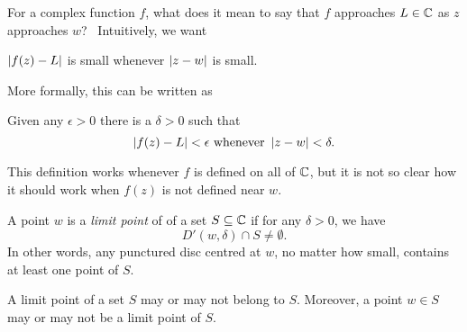  For a complex function $f$, what does it mean to say that $f$ approaches $L \in \mathbb{C}$ as $z$ approaches $w$?  \ Intuitively, we want
 \begin{center}
 $\left| f(z)-L \right|$ is small whenever  $\left| z-w \right|$ is small.
 \end{center}
  More formally, this can be written as
 \begin{center}
 Given any $\epsilon>0$ there is a $\delta>0$ such that
 \[
 \left| f(z)-L \right| < \epsilon\text{ whenever } \left| z-w \right|<\delta.
 \]
 \end{center}
 
 This definition works whenever $f$ is defined on all of $\mathbb{C}$, but it is not so clear how it should work when $f(z)$ is not defined near $w$.  
 
 
 \begin{definition}
 A point $w$ is a \emph{limit point} of of a set $S \subseteq \mathbb{C}$  if for any $\delta>0$, we have
 \[
 D'(w,\delta) \cap S \neq \emptyset.
 \]
 In other words, any punctured disc centred at $w$, no matter how small, contains at least one point of $S$.
 \end{definition}

A limit point of a set $S$ may or may not belong to $S$.  Moreover, a point $w \in S$ may or may not be a limit point of $S$.  



